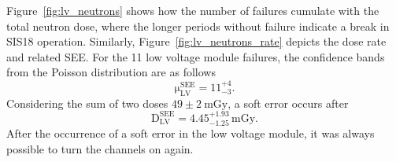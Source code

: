 Figure~\ref{fig:lv_neutrons} shows how the number of failures cumulate with the total neutron dose, where the longer periods without failure indicate a break in SIS18 operation. Similarly, Figure~\ref{fig:lv_neutrons_rate} depicts the dose rate and related \gls{SEE}.
For the 11 low voltage module failures, the confidence bands from the Poisson distribution are as follows
   \begin{equation}
  \mathrm{\mu}_{\mathrm{LV}}^{\mathrm{SEE}}=\mathrm{11}_{-3}^{+4}.
\end{equation}
Considering the sum of two doses $49\pm{2}\mathrm{\ mGy}$, a soft error occurs after
\begin{equation}
    \mathrm{D}_{\mathrm{LV}}^{\mathrm{SEE}}=\mathrm{4.45}_{-1.25}^{+1.93}\mathrm{\,mGy}.
\end{equation}
After the occurrence of a soft error in the low voltage module, it was always possible to turn the channels on again.

